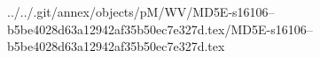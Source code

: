 ../../.git/annex/objects/pM/WV/MD5E-s16106--b5be4028d63a12942af35b50ec7e327d.tex/MD5E-s16106--b5be4028d63a12942af35b50ec7e327d.tex